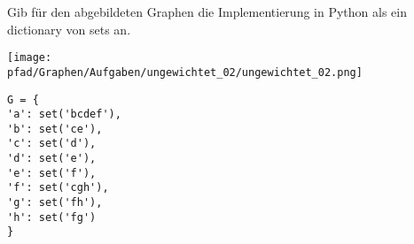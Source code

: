 ﻿\question[3]
Gib für den abgebildeten Graphen die Implementierung in Python als
ein dictionary von sets an.

\texttt{[image: \\pfad/Graphen/Aufgaben/ungewichtet\_02/ungewichtet\_02.png]}
\begin{solutionbox}{5cm}
\begin{lstlisting}
G = {
'a': set('bcdef'),
'b': set('ce'),
'c': set('d'),
'd': set('e'),
'e': set('f'),
'f': set('cgh'),
'g': set('fh'),
'h': set('fg')
}
\end{lstlisting}
\end{solutionbox}
